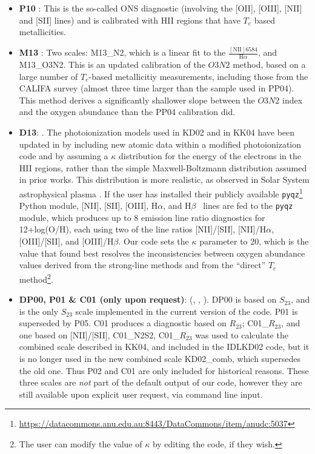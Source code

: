 \documentclass{emulateapj}
\newcommand{\ha}{H$\alpha$}
\newcommand{\hb}{H$\beta$}
\begin{document}
\begin{itemize}
\item {\bf P10} \citep{pilyugin10}: This is the so-called ONS diagnostic (involving the [OII], [OIII], [NII] and [SII] lines) and is calibrated with HII regions that have $T_e$ based metallicities.
\item {\bf M13} \citep{marino13}: Two scales: M13\_N2, which is a linear fit to the $\frac{\mathrm{[NII]6584}}{\mathrm{H}\alpha}$, and  M13\_O3N2. This is an updated calibration of the $O3N2$ method, based on a large number of $T_e$-based metallicitiy measurements, including those from the CALIFA survey (almost three time larger than the sample used in PP04). This method derives a significantly shallower slope between the $O3N2$ index and the oxygen abundance than the PP04 calibration did.
\item {\bf D13}: \citep{dopita13}. The photoionization models used in KD02 and in KK04 have been updated in \citet{dopita13} by including new atomic data within a modified photoionization code and by assuming a $\kappa$ distribution for the energy of the electrons in the HII regions, rather than the simple  Maxwell-Boltzmann distribution assumed in prior works. This distribution is more realistic, as observed in Solar System astrophysical plasma \citep{nicholls12}. If the user has installed their publicly available \verb=pyqz=\footnote{\url{https://datacommons.anu.edu.au:8443/DataCommons/item/anudc:5037}} Python module, [NII], [SII], [OIII], \ha, and \hb~ lines are fed to the \verb=pyqz= module, which produces up to 8 emission line ratio diagnostics for 12+log(O/H), each using two of the line ratios [NII]/[SII], [NII]/\ha, [OIII]/[SII], and [OIII]/\hb. Our code sets the $\kappa$ parameter to 20, which is the value that \citet{dopita13} found best resolves the inconsistencies between oxygen abundance values derived from the strong-line methods and from the ``direct'' $T_e$ method\footnote{The user can modify the value of $\kappa$ by editing the code, if they wish.}.
\item{\bf DP00, P01 \& C01 (only upon request)}: (\citealt{diaz00}, \citealt{pilyugin01}, \citealt{charlot01}). DP00 is based on $S_{23}$, and is the only $S_{23}$ scale implemented in the current version of the code. P01 is superseded by P05. C01 produces a diagnostic based on $R_{23}$; C01\_$R_{23}$, and one based on [NII]/[SII], C01\_N2S2, C01\_$R_{23}$ was used to calculate the combined scale described in KK04, and included in the IDLKD02 code, but it is no longer used in the new combined scale KD02\_comb, which supersedes the old one. Thus P02 and C01 are only included for historical reasons. These three scales are \emph{not} part of the default output of our code, however they are still available upon explicit user request, via command line input.

\end{itemize}
\end{document}
